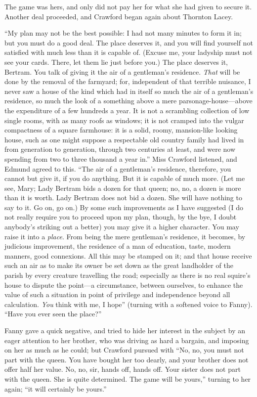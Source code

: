 \documentclass{article}
\begin{document}
The game was hers, and only did not pay her for what
she had given to secure it.  Another deal proceeded,
and Crawford began again about Thornton Lacey.

``My plan may not be the best possible:  I had not many
minutes to form it in; but you must do a good deal.
The place deserves it, and you will find yourself not
satisfied with much less than it is capable of.  (Excuse me,
your ladyship must not see your cards.  There, let them
lie just before you.) The place deserves it, Bertram.
You talk of giving it the air of a gentleman's residence.
\emph{That} will be done by the removal of the farmyard;
for, independent of that terrible nuisance, I never saw
a house of the kind which had in itself so much the air
of a gentleman's residence, so much the look of a something
above a mere parsonage-house---above the expenditure of a few
hundreds a year.  It is not a scrambling collection of low
single rooms, with as many roofs as windows; it is not
cramped into the vulgar compactness of a square farmhouse:
it is a solid, roomy, mansion-like looking house, such as one
might suppose a respectable old country family had lived
in from generation to generation, through two centuries
at least, and were now spending from two to three thousand
a year in.''  Miss Crawford listened, and Edmund agreed
to this.  ``The air of a gentleman's residence, therefore,
you cannot but give it, if you do anything.  But it is
capable of much more.  (Let me see, Mary; Lady Bertram
bids a dozen for that queen; no, no, a dozen is more
than it is worth.  Lady Bertram does not bid a dozen.
She will have nothing to say to it.  Go on, go on.)
By some such improvements as I have suggested (I do not really
require you to proceed upon my plan, though, by the bye,
I doubt anybody's striking out a better) you may give it
a higher character.  You may raise it into a \emph{place}.
From being the mere gentleman's residence, it becomes,
by judicious improvement, the residence of a man
of education, taste, modern manners, good connexions.
All this may be stamped on it; and that house receive
such an air as to make its owner be set down as the great
landholder of the parish by every creature travelling
the road; especially as there is no real squire's house
to dispute the point---a circumstance, between ourselves,
to enhance the value of such a situation in point
of privilege and independence beyond all calculation.
\emph{You} think with me, I hope'' (turning with a softened
voice to Fanny). ``Have you ever seen the place?''

Fanny gave a quick negative, and tried to hide her interest
in the subject by an eager attention to her brother,
who was driving as hard a bargain, and imposing on her
as much as he could; but Crawford pursued with ``No, no,
you must not part with the queen.  You have bought
her too dearly, and your brother does not offer half
her value.  No, no, sir, hands off, hands off.  Your sister
does not part with the queen.  She is quite determined.
The game will be yours,'' turning to her again; ``it will
certainly be yours.''
\end{document}
